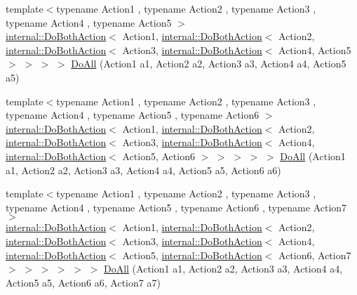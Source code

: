 \begin{DoxyCompactItemize}
\item 
{\footnotesize template$<$typename Action1 , typename Action2 , typename Action3 , typename Action4 , typename Action5 $>$ }\\\mbox{\hyperlink{classtesting_1_1internal_1_1DoBothAction}{internal\+::\+Do\+Both\+Action}}$<$ Action1, \mbox{\hyperlink{classtesting_1_1internal_1_1DoBothAction}{internal\+::\+Do\+Both\+Action}}$<$ Action2, \mbox{\hyperlink{classtesting_1_1internal_1_1DoBothAction}{internal\+::\+Do\+Both\+Action}}$<$ Action3, \mbox{\hyperlink{classtesting_1_1internal_1_1DoBothAction}{internal\+::\+Do\+Both\+Action}}$<$ Action4, Action5 $>$ $>$ $>$ $>$ \mbox{\hyperlink{namespacetesting_a794c41d43373d7af9cebbc7f1c5e4a57}{Do\+All}} (Action1 a1, Action2 a2, Action3 a3, Action4 a4, Action5 a5)
\item 
{\footnotesize template$<$typename Action1 , typename Action2 , typename Action3 , typename Action4 , typename Action5 , typename Action6 $>$ }\\\mbox{\hyperlink{classtesting_1_1internal_1_1DoBothAction}{internal\+::\+Do\+Both\+Action}}$<$ Action1, \mbox{\hyperlink{classtesting_1_1internal_1_1DoBothAction}{internal\+::\+Do\+Both\+Action}}$<$ Action2, \mbox{\hyperlink{classtesting_1_1internal_1_1DoBothAction}{internal\+::\+Do\+Both\+Action}}$<$ Action3, \mbox{\hyperlink{classtesting_1_1internal_1_1DoBothAction}{internal\+::\+Do\+Both\+Action}}$<$ Action4, \mbox{\hyperlink{classtesting_1_1internal_1_1DoBothAction}{internal\+::\+Do\+Both\+Action}}$<$ Action5, Action6 $>$ $>$ $>$ $>$ $>$ \mbox{\hyperlink{namespacetesting_aa6c87c8d7520fb333f1559487d3e06e9}{Do\+All}} (Action1 a1, Action2 a2, Action3 a3, Action4 a4, Action5 a5, Action6 a6)
\item 
{\footnotesize template$<$typename Action1 , typename Action2 , typename Action3 , typename Action4 , typename Action5 , typename Action6 , typename Action7 $>$ }\\\mbox{\hyperlink{classtesting_1_1internal_1_1DoBothAction}{internal\+::\+Do\+Both\+Action}}$<$ Action1, \mbox{\hyperlink{classtesting_1_1internal_1_1DoBothAction}{internal\+::\+Do\+Both\+Action}}$<$ Action2, \mbox{\hyperlink{classtesting_1_1internal_1_1DoBothAction}{internal\+::\+Do\+Both\+Action}}$<$ Action3, \mbox{\hyperlink{classtesting_1_1internal_1_1DoBothAction}{internal\+::\+Do\+Both\+Action}}$<$ Action4, \mbox{\hyperlink{classtesting_1_1internal_1_1DoBothAction}{internal\+::\+Do\+Both\+Action}}$<$ Action5, \mbox{\hyperlink{classtesting_1_1internal_1_1DoBothAction}{internal\+::\+Do\+Both\+Action}}$<$ Action6, Action7 $>$ $>$ $>$ $>$ $>$ $>$ \mbox{\hyperlink{namespacetesting_aadfaf4eb9897dcabe067b1d882febc86}{Do\+All}} (Action1 a1, Action2 a2, Action3 a3, Action4 a4, Action5 a5, Action6 a6, Action7 a7)

\end{DoxyCompactItemize}
